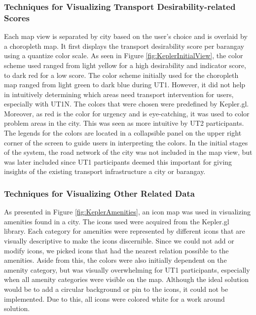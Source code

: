 \documentclass{sigchi}
\begin{document}
\subsubsection{Techniques for Visualizing Transport Desirability-related Scores}
Each map view is separated by city based on the user’s choice and is overlaid by a choropleth map. It first displays the transport desirability score per barangay using a quantize color scale. As seen in Figure \ref{fig:KeplerInitialView}, the color scheme used ranged from light yellow for a high desirability and indicator score, to dark red for a low score. The color scheme initially used for the choropleth map ranged from light green to dark blue during UT1. However, it did not help in intuitively determining which areas need transport intervention for users, especially with UT1N. The colors that were chosen were predefined by Kepler.gl. Moreover, as red is the color for urgency and is eye-catching, it was used to color problem areas in the city. This was seen as more intuitive by UT2 participants. The legends for the colors are located in a collapsible panel on the upper right corner of the screen to guide users in interpreting the colors. In the initial stages of the system, the road network of the city was not included in the map view, but was later included since UT1 participants deemed this important for giving insights of the existing transport infrastructure a city or barangay.

\subsubsection{Techniques for Visualizing Other Related Data}
As presented in Figure \ref{fig:KeplerAmenities}, an icon map was used in visualizing amenities found in a city. The icons used were acquired from the Kepler.gl library. Each category for amenities were represented by different icons that are visually descriptive to make the icons discernible. Since we could not add or modify icons, we picked icons that had the nearest relation possible to the amenities. Aside from this, the colors were also initially dependent on the amenity category, but was visually overwhelming for UT1 participants, especially when all amenity categories were visible on the map. Although the ideal solution would be to add a circular background or pin to the icons, it could not be implemented. Due to this, all icons were colored white for a work around solution.
\end{document}
